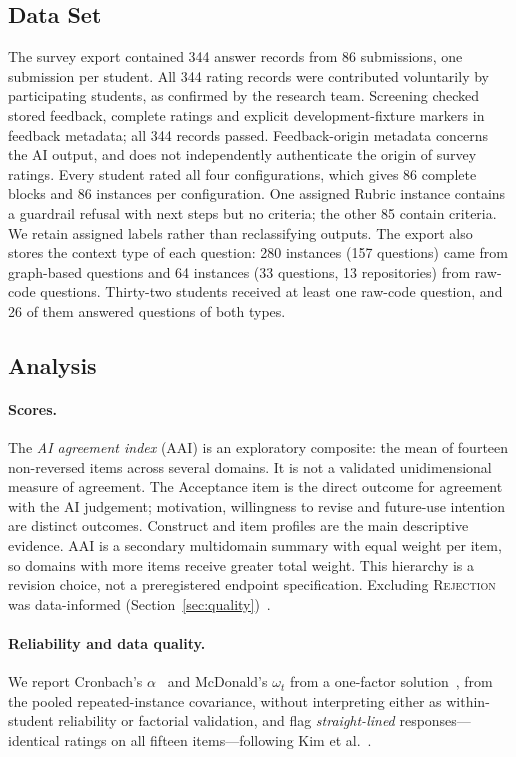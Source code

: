 \documentclass[runningheads]{llncs}
\begin{document}
\subsection{Data Set}
The survey export contained 344 answer records from 86 submissions, one submission per student. All 344 rating records were contributed voluntarily by participating students, as confirmed by the research team. Screening checked stored feedback, complete ratings and explicit development-fixture markers in feedback metadata; all 344 records passed. Feedback-origin metadata concerns the AI output, and does not independently authenticate the origin of survey ratings. Every student rated all four configurations, which gives 86 complete blocks and 86 instances per configuration. One assigned Rubric instance contains a guardrail refusal with next steps but no criteria; the other 85 contain criteria. We retain assigned labels rather than reclassifying outputs. The export also stores the context type of each question: 280 instances (157 questions) came from graph-based questions and 64 instances (33 questions, 13 repositories) from raw-code questions. Thirty-two students received at least one raw-code question, and 26 of them answered questions of both types.

\subsection{Analysis}
\paragraph{Scores.} The \emph{AI agreement index} (AAI) is an exploratory composite: the mean of fourteen non-reversed items across several domains. It is not a validated unidimensional measure of agreement. The Acceptance item is the direct outcome for agreement with the AI judgement; motivation, willingness to revise and future-use intention are distinct outcomes. Construct and item profiles are the main descriptive evidence. AAI is a secondary multidomain summary with equal weight per item, so domains with more items receive greater total weight. This hierarchy is a revision choice, not a preregistered endpoint specification. Excluding \textsc{Rejection} was data-informed (Section~\ref{sec:quality})~\cite{vansonderen2013ineffectiveness}.

\paragraph{Reliability and data quality.} We report Cronbach's $\alpha$~\cite{cronbach1951coefficient} and McDonald's $\omega_t$ from a one-factor solution~\cite{hayes2020use}, from the pooled repeated-instance covariance, without interpreting either as within-student reliability or factorial validation, and flag \emph{straight-lined} responses---identical ratings on all fifteen items---following Kim et al.~\cite{kim2019straightlining}.
\end{document}
